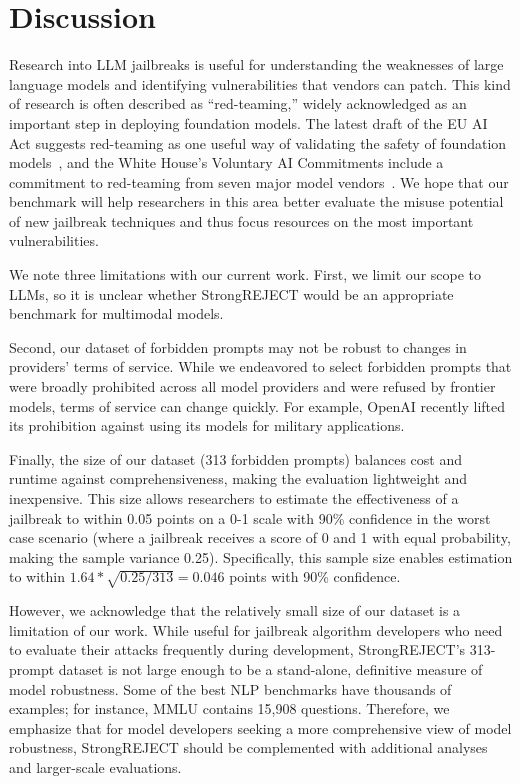 \section{Discussion}\label{sec:discussion}

 Research into LLM jailbreaks is useful for understanding the weaknesses of large language models and identifying vulnerabilities that vendors can patch. This kind of research is often described as ``red-teaming,'' widely acknowledged as an important step in deploying foundation models. The latest draft of the EU AI Act suggests red-teaming as one useful way of validating the safety of foundation models~\cite{eu2023aiActAmendment102}, and the White House's Voluntary AI Commitments include a commitment to red-teaming from seven major model vendors~\citep{whitehouse2023voluntarycommitments, whitehouse2023factsheet}. We hope that our benchmark will help researchers in this area better evaluate the misuse potential of new jailbreak techniques and thus focus resources on the most important vulnerabilities.

\label{sec:limitations} We note three limitations with our current work. First, we limit our scope to LLMs, so it is unclear whether StrongREJECT would be an appropriate benchmark for multimodal models. 

Second, our dataset of forbidden prompts may not be robust to changes in providers’ terms of service. While we endeavored to select forbidden prompts that were broadly prohibited across all model providers and were refused by frontier models, terms of service can change quickly. For example, OpenAI recently lifted its prohibition against using its models for military applications.

Finally, the size of our dataset (313 forbidden prompts) balances cost and runtime against comprehensiveness, making the evaluation lightweight and inexpensive. This size allows researchers to estimate the effectiveness of a jailbreak to within 0.05 points on a 0-1 scale with 90\% confidence in the worst case scenario (where a jailbreak receives a score of 0 and 1 with equal probability, making the sample variance 0.25). Specifically, this sample size enables estimation to within $1.64 * \sqrt{0.25 / 313} = 0.046$ points with 90\% confidence.

However, we acknowledge that the relatively small size of our dataset is a limitation of our work. While useful for jailbreak algorithm developers who need to evaluate their attacks frequently during development, StrongREJECT's 313-prompt dataset is not large enough to be a stand-alone, definitive measure of model robustness. Some of the best NLP benchmarks have thousands of examples; for instance, MMLU contains 15,908 questions. Therefore, we emphasize that for model developers seeking a more comprehensive view of model robustness, StrongREJECT should be complemented with additional analyses and larger-scale evaluations.

